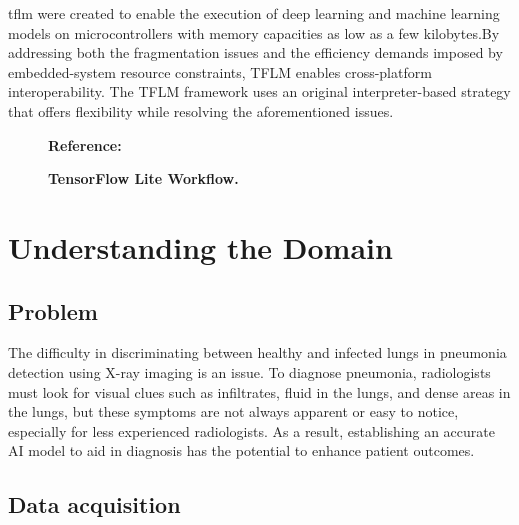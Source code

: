 \bigskip


\ac{tflm} were created to enable the execution of deep learning and machine learning models on microcontrollers with memory capacities as low as a few kilobytes.By addressing both the fragmentation issues and the efficiency demands imposed by embedded-system resource constraints, TFLM enables cross-platform interoperability. The TFLM framework uses an original interpreter-based strategy that offers flexibility while resolving the aforementioned issues. \cite{Robert:2021}

\begin{figure}
	\centering
	\caption{\textbf{TensorFlow Lite Workflow.}}
	\footnotesize \textbf{Reference:}\autocite{Khandelwal:2020}
	\label{fig:Tensor Flow Lite Workflow}
\end{figure}

\section{Understanding the Domain}

\subsection{Problem}

The difficulty in discriminating between healthy and infected lungs in pneumonia detection using X-ray imaging is an issue. To diagnose pneumonia, radiologists must look for visual clues such as infiltrates, fluid in the lungs, and dense areas in the lungs, but these symptoms are not always apparent or easy to notice, especially for less experienced radiologists. As a result, establishing an accurate AI model to aid in diagnosis has the potential to enhance patient outcomes.\\

\subsection{Data acquisition}

